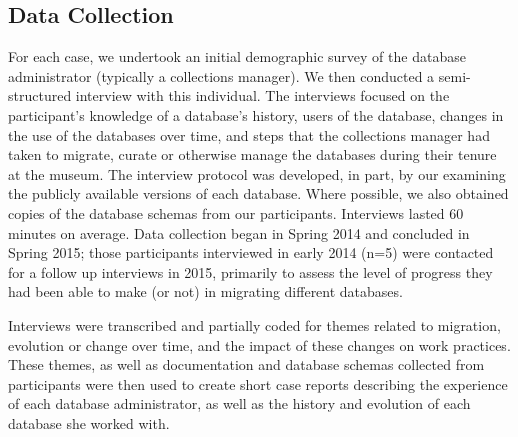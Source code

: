 \subsection{Data Collection}

For each case, we undertook an initial demographic survey of the database administrator (typically a collections manager). We then conducted a semi-structured interview with this individual. The interviews focused on the participant's knowledge of a database's history, users of the database, changes in the use of the databases over time, and steps that the collections manager had taken to migrate, curate or otherwise manage the databases during their tenure at the museum. The interview protocol was developed, in part, by our examining the publicly available versions of each database. Where possible, we also obtained copies of the database schemas from our participants. Interviews lasted 60 minutes on average. Data collection began in Spring 2014 and concluded in Spring 2015; those participants interviewed in early 2014 (n=5) were contacted for a follow up interviews in 2015, primarily to assess the level of progress they had been able to make (or not) in migrating different databases.

Interviews were transcribed and partially coded for themes related to migration, evolution or change over time, and the impact of these changes on work practices. These themes, as well as documentation and database schemas collected from participants were then used to create short case reports describing the experience of each database administrator, as well as the history and evolution of each database she worked with. \ 